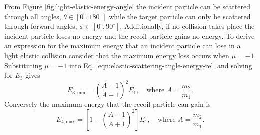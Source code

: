 \documentclass[../main.tex]{subfiles}
\begin{document}
From Figure \ref{fig:light-elastic-energy-angle} the incident particle can be scattered through all angles, $\theta \in [0^{\circ}, 180^{\circ}]$ while the target particle can only be scattered through forward angles, $\phi \in [0^{\circ}, 90^{\circ}]$. Additionally, if no collision takes place the incident particle loses no energy and the recoil particle gains no energy. To derive an expression for the maximum energy that an incident particle can lose in a light elastic collision consider that the maximum energy loss occurs when $\mu = -1$. Substituting $\mu = -1$ into Eq. \eqref{eqn:elastic-scattering-angle-energy-rel} and solving for $E_3$ gives
\begin{equation}
  E_{3,\text{min}} = \left(\dfrac{A - 1}{A + 1}\right)^2 E_1, \quad \text{where} \,\, A = \dfrac{m_2}{m_1}.
\end{equation}
Conversely the maximum energy that the recoil particle can gain is 
\begin{equation}
  E_{4,\text{max}} = \left[1 - \left(\dfrac{A - 1}{A + 1}\right)^2\right] E_1, \quad \text{where} \,\, A = \dfrac{m_2}{m_1}.
\end{equation}
\end{document}
